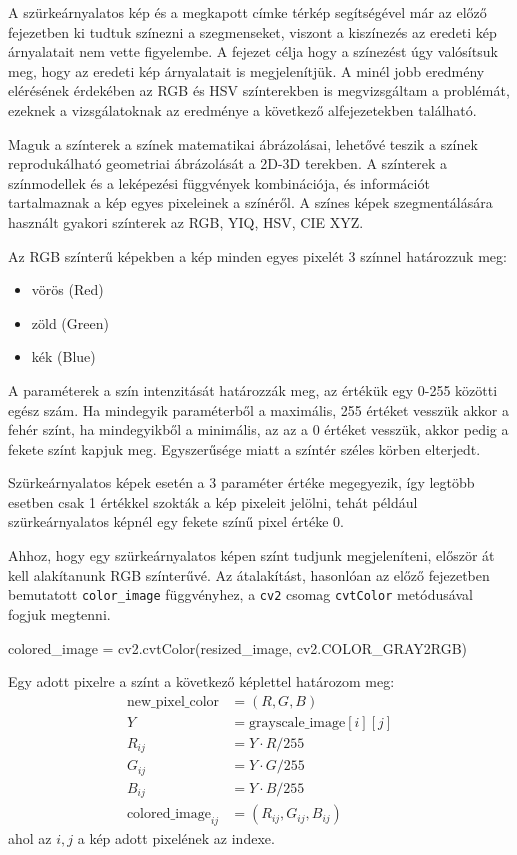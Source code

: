 
A szürkeárnyalatos kép és a megkapott címke térkép segítségével már az előző fejezetben ki tudtuk színezni a szegmenseket, viszont a kiszínezés az eredeti kép árnyalatait nem vette figyelembe. A fejezet célja hogy a színezést úgy valósítsuk meg, hogy az eredeti kép árnyalatait is megjelenítjük. A minél jobb eredmény elérésének érdekében az RGB és HSV színterekben is megvizsgáltam a problémát, ezeknek a vizsgálatoknak az eredménye a következő alfejezetekben található.

Maguk a színterek a színek matematikai ábrázolásai, lehetővé teszik a színek reprodukálható geometriai ábrázolását a 2D-3D terekben. A színterek a színmodellek és a leképezési függvények kombinációja, és információt tartalmaznak a kép egyes pixeleinek a színéről. A színes képek szegmentálására használt gyakori színterek az RGB, YIQ, HSV, CIE XYZ. \cite{colorspaces}


Az RGB színterű képekben a kép minden egyes pixelét 3 színnel határozzuk meg:
\begin{itemize}
\item vörös (Red)
\item zöld (Green)
\item kék (Blue)
\end{itemize}
A paraméterek a szín intenzitását határozzák meg, az értékük egy 0-255 közötti egész szám. Ha mindegyik paraméterből a maximális, 255 értéket vesszük akkor a fehér színt, ha mindegyikből a minimális, az az a 0 értéket vesszük, akkor pedig a fekete színt kapjuk meg.  Egyszerűsége miatt a színtér széles körben elterjedt. \cite{colorspaces}

Szürkeárnyalatos képek esetén a 3 paraméter értéke megegyezik, így legtöbb esetben csak 1 értékkel szokták a kép pixeleit jelölni, tehát például szürkeárnyalatos képnél egy fekete színű pixel értéke 0.

Ahhoz, hogy egy szürkeárnyalatos képen színt tudjunk megjeleníteni, először át kell alakítanunk RGB színterűvé. Az átalakítást, hasonlóan az előző fejezetben bemutatott \texttt{color\_image} függvényhez, a \texttt{cv2} csomag \texttt{cvtColor} metódusával fogjuk megtenni.
\begin{python}
colored_image = cv2.cvtColor(resized_image, cv2.COLOR_GRAY2RGB)
\end{python}

Egy adott pixelre a színt a következő képlettel határozom meg:
\begin{align*}
 \text{new\_pixel\_color} & = (R, G, B) \\
 Y & = \text{grayscale\_image}[i][j]\\
 R_{ij} & = Y \cdot R / 255 \\
 G_{ij} & = Y \cdot G / 255 \\
 B_{ij} & = Y \cdot B / 255 \\
 \text{colored\_image}_{ij} & = (R_{ij}, G_{ij}, B_{ij})
\end{align*}
\noindent ahol az $i,j$ a kép adott pixelének az indexe.

